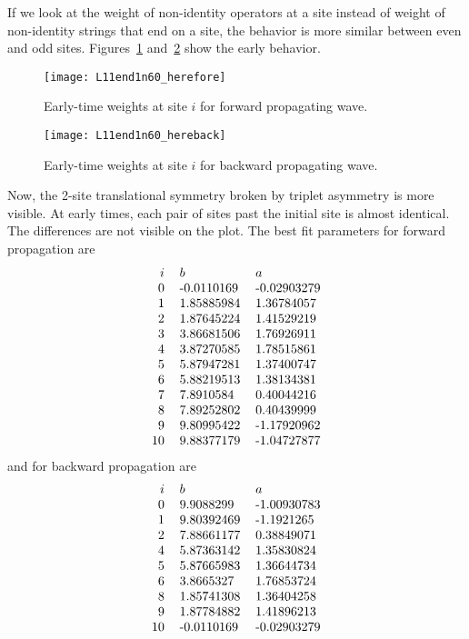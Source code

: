 \documentclass[11pt]{article}
\begin{document}
If we look at the weight of non-identity operators at a site instead of weight of non-identity strings that end on a site, the behavior is more similar between even and odd sites. Figures~\ref{fig:L11end1n60_herefore} and~\ref{fig:L11end1n60_hereback} show the early behavior.
\begin{figure}
	\centering
	\texttt{[image: L11end1n60\_herefore]}
	\caption{Early-time weights at site $i$ for forward propagating wave.}
	\label{fig:L11end1n60_herefore}
\end{figure}
\begin{figure}
	\centering
	\texttt{[image: L11end1n60\_hereback]}
	\caption{Early-time weights at site $i$ for backward propagating wave.}
	\label{fig:L11end1n60_hereback}
\end{figure}
Now, the 2-site translational symmetry broken by triplet asymmetry is more visible. At early times, each pair of sites past the initial site is almost identical. The differences are not visible on the plot. The best fit parameters for forward propagation are 
\begin{align*}
\begin{tabular}{rll}
$i$ & $b$ & $a$\\
0 &-0.0110169 & -0.02903279\\
1 & 1.85885984&  1.36784057\\
2 & 1.87645224&  1.41529219\\
3 & 3.86681506&  1.76926911\\
4 & 3.87270585 & 1.78515861\\
5 & 5.87947281 & 1.37400747\\
6 & 5.88219513 & 1.38134381\\
7 & 7.8910584  & 0.40044216\\
8 & 7.89252802 & 0.40439999\\
9 & 9.80995422 &-1.17920962\\
10 & 9.88377179 &-1.04727877
\end{tabular}
\end{align*}
and for backward propagation are
\begin{align*}
\begin{tabular}{rll}
$i$ & $b$ & $a$\\
0 & 9.9088299 & -1.00930783\\
1 & 9.80392469& -1.1921265 \\
2 & 7.88661177&  0.38849071\\
4 & 5.87363142&  1.35830824\\
5 & 5.87665983&  1.36644734\\
6 & 3.8665327 &  1.76853724\\
8 & 1.85741308&  1.36404258\\
9 & 1.87784882&  1.41896213\\
10 &-0.0110169&  -0.02903279\\
\end{tabular}
\end{align*}
\end{document}
